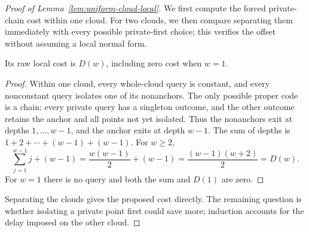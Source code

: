 \begin{proof}[Proof of Lemma~\ref{lem:uniform-cloud-local}]
We first compute the forced private-chain cost within one cloud.
For two clouds, we then compare separating them immediately with
every possible private-first choice; this verifies the offset without
assuming a local normal form.

\begin{claim}
\label{clm:uniform-cloud-chain}
Its raw local cost is $D(w)$, including zero cost when $w=1$.
\end{claim}
\begin{proof}
Within one cloud, every whole-cloud query is constant, and every
nonconstant query isolates one of its nonanchors. The only possible
proper code is a chain: every private query has a singleton outcome,
and the other outcome retains the anchor and all points not yet
isolated. Thus the nonanchors exit at depths $1,\ldots,w-1$, and
the anchor exits at depth $w-1$. The sum of depths is
$1+2+\cdots+(w-1)+(w-1)$. For $w\ge2$,
\[
 \sum_{j=1}^{w-1}j+(w-1)
 =\frac{w(w-1)}2+(w-1)
 =\frac{(w-1)(w+2)}2=D(w).
\]
For $w=1$ there is no query and both the sum and $D(1)$ are zero.

\end{proof}
Separating the clouds gives the proposed cost directly. The remaining
question is whether isolating a private point first could save more;
induction accounts for the delay imposed on the other cloud.


\end{proof}
